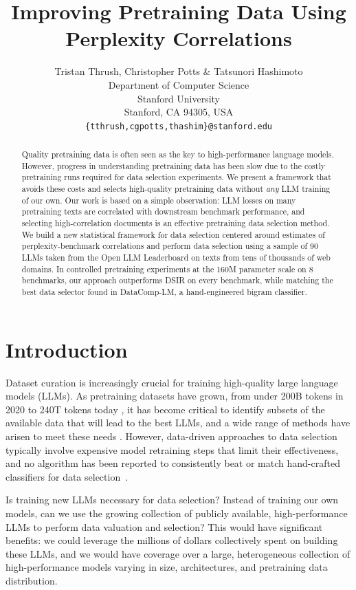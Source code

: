 \documentclass{article} %
\title{Improving Pretraining Data Using\\  Perplexity Correlations}
\author{Tristan Thrush, Christopher Potts \& Tatsunori Hashimoto \\
Department of Computer Science\\
Stanford University\\
Stanford, CA 94305, USA \\
\texttt{\{tthrush,cgpotts,thashim\}@stanford.edu} \\
}
\begin{document}
\maketitle

\begin{abstract}
Quality pretraining data is often seen as the key to high-performance language models. However, progress in understanding pretraining data has been slow due to the costly pretraining runs required for data selection experiments. We present a framework that avoids these costs and selects high-quality pretraining data without \emph{any} LLM training of our own.  Our work is based on a simple observation: LLM losses on many pretraining texts are correlated with downstream benchmark performance, and selecting high-correlation documents is an effective pretraining data selection method. We build a new statistical framework for data selection centered around estimates of perplexity-benchmark correlations and perform data selection using a sample of 90 LLMs taken from the Open LLM Leaderboard on texts from tens of thousands of web domains. In controlled pretraining experiments at the 160M parameter scale on 8 benchmarks, our approach outperforms DSIR on every benchmark, while matching the best data selector found in DataComp-LM, a hand-engineered bigram classifier.
\end{abstract}

\section{Introduction}

Dataset curation is increasingly crucial for training high-quality large language models (LLMs). As pretraining datasets have grown, from under 200B tokens in 2020 \citep{raffel2019exploring,pile} to 240T tokens today \citep{datacomp}, it has become critical to identify subsets of the available data that will lead to the best LLMs, and a wide range of methods have arisen to meet these needs \citep{datamodels, doremi, dsir, dsdm, gio, regmix, llama3}. However, data-driven approaches to data selection typically involve expensive model retraining steps that limit their effectiveness, and no algorithm has been reported to consistently beat or match hand-crafted classifiers for data selection~\citep{datacomp}.

Is training new LLMs necessary for data selection? Instead of training our own models, can we use the growing collection of publicly available, high-performance LLMs \citep{transformers, openllmleaderboard} to perform data valuation and selection? This would have significant benefits: we could leverage the millions of dollars collectively spent on building these LLMs, and we would have coverage over a large, heterogeneous collection of high-performance models varying in size, architectures, and pretraining data distribution. 
\end{document}
